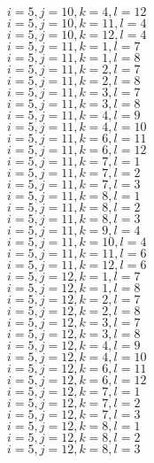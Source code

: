 \documentclass[14pt]{article}
\begin{document}
    $i=5,j=10,k=4,l=12 $ \\ 
    $i=5,j=10,k=11,l=4 $ \\ 
    $i=5,j=10,k=12,l=4 $ \\ 
    $i=5,j=11,k=1,l=7 $ \\ 
    $i=5,j=11,k=1,l=8 $ \\ 
    $i=5,j=11,k=2,l=7 $ \\ 
    $i=5,j=11,k=2,l=8 $ \\ 
    $i=5,j=11,k=3,l=7 $ \\ 
    $i=5,j=11,k=3,l=8 $ \\ 
    $i=5,j=11,k=4,l=9 $ \\ 
    $i=5,j=11,k=4,l=10 $ \\ 
    $i=5,j=11,k=6,l=11 $ \\ 
    $i=5,j=11,k=6,l=12 $ \\ 
    $i=5,j=11,k=7,l=1 $ \\ 
    $i=5,j=11,k=7,l=2 $ \\ 
    $i=5,j=11,k=7,l=3 $ \\ 
    $i=5,j=11,k=8,l=1 $ \\ 
    $i=5,j=11,k=8,l=2 $ \\ 
    $i=5,j=11,k=8,l=3 $ \\ 
    $i=5,j=11,k=9,l=4 $ \\ 
    $i=5,j=11,k=10,l=4 $ \\ 
    $i=5,j=11,k=11,l=6 $ \\ 
    $i=5,j=11,k=12,l=6 $ \\ 
    $i=5,j=12,k=1,l=7 $ \\ 
    $i=5,j=12,k=1,l=8 $ \\ 
    $i=5,j=12,k=2,l=7 $ \\ 
    $i=5,j=12,k=2,l=8 $ \\ 
    $i=5,j=12,k=3,l=7 $ \\ 
    $i=5,j=12,k=3,l=8 $ \\ 
    $i=5,j=12,k=4,l=9 $ \\ 
    $i=5,j=12,k=4,l=10 $ \\ 
    $i=5,j=12,k=6,l=11 $ \\ 
    $i=5,j=12,k=6,l=12 $ \\ 
    $i=5,j=12,k=7,l=1 $ \\ 
    $i=5,j=12,k=7,l=2 $ \\ 
    $i=5,j=12,k=7,l=3 $ \\ 
    $i=5,j=12,k=8,l=1 $ \\ 
    $i=5,j=12,k=8,l=2 $ \\ 
    $i=5,j=12,k=8,l=3 $ \\ 
\end{document}
